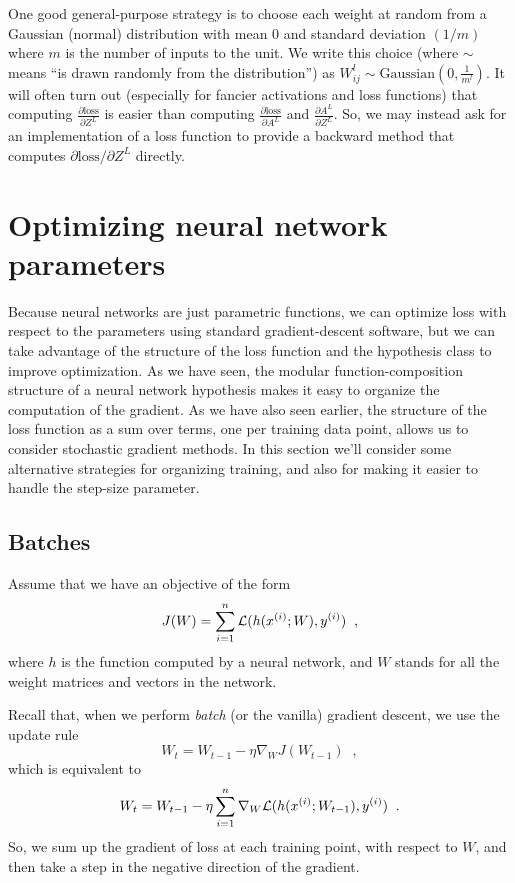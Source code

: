 One good general-purpose strategy is to choose each weight at random
from a Gaussian (normal) distribution with mean 0 and standard
deviation $(1/m)$ where $m$ is the number of inputs to the unit.
  We write this choice (where $\sim$ means ``is drawn
randomly from the distribution'') as $W^l_{ij} \sim \text{Gaussian}\left(0,
  \frac{1}{m^l}\right).$ It will often turn out (especially for fancier activations and loss
functions) that computing
$\frac{\partial \text{loss}}{\partial Z^L}$ is easier than computing
$\frac{\partial \text{loss}}{\partial A^L}$ and $\frac{\partial A^L}{\partial Z^L}.$ So, we may instead ask for an implementation of a loss function to provide a backward method that computes $\partial \text{loss}/\partial Z^L$ directly.


\section{Optimizing neural network parameters}
\label{sec-make_nn_work}

Because neural networks are just parametric functions, we can optimize
loss with respect to the parameters using standard gradient-descent
software, but we can take advantage of the structure of the loss
function and the hypothesis class to improve optimization.  As we have
seen, the modular function-composition structure of a neural network
hypothesis makes it easy to organize the computation of the gradient.
As we have also seen earlier, the structure of the loss function as a
sum over terms, one per training data point, allows us to consider
stochastic gradient methods.  In this section we'll consider some
alternative strategies for organizing training, and also for making it
easier to handle the step-size parameter.

\subsection{Batches}
Assume that we have an objective of the form
\[J(W) = \sum_{i = 1}^n \mathcal{L}(h(x^{(i)}; W),  y^{(i)})\;\;,\]
where $h$ is the function computed by a neural network, and $W$ stands
for all the weight matrices and vectors in the network.

Recall that, when we perform {\em batch} (or the vanilla) gradient descent, we use the update rule
\[W_t = W_{t-1} - \eta\nabla_W J(W_{t-1})\;\;,\]
which is equivalent to
\[W_t = W_{t-1} - \eta\sum_{i=1}^n \nabla_W \mathcal{L}(h(x^{(i)}; W_{t-1}),
  y^{(i)})\;\;.\]
So, we sum up the gradient of loss at each training point,  with
respect to $W$, and then take a step in the negative direction of
the gradient.

